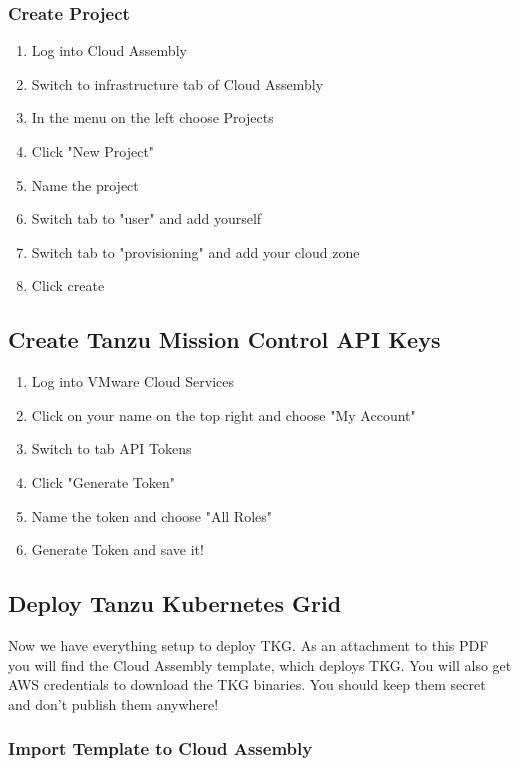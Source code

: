 \documentclass{article}
\begin{document}
\subsubsection{Create Project}

\begin{enumerate}
  \item Log into Cloud Assembly
  \item Switch to infrastructure tab of Cloud Assembly
  \item In the menu on the left choose Projects
  \item Click "New Project"
  \item Name the project
  \item Switch tab to "user" and add yourself
  \item Switch tab to "provisioning" and add your cloud zone
  \item Click create
\end{enumerate}

\subsection{Create Tanzu Mission Control API Keys} \label{tmctoken}

\begin{enumerate}
  \item Log into VMware Cloud Services
  \item Click on your name on the top right and choose "My Account"
  \item Switch to tab API Tokens
  \item Click "Generate Token"
  \item Name the token and choose "All Roles"
  \item Generate Token and save it!
\end{enumerate}

\subsection{Deploy Tanzu Kubernetes Grid}

Now we have everything setup to deploy TKG. As an attachment to this PDF you will find the Cloud Assembly template, which deploys TKG. You will also get AWS credentials to download the TKG binaries. You should keep them secret and don't publish them anywhere!


\subsubsection{Import Template to Cloud Assembly}
\end{document}

